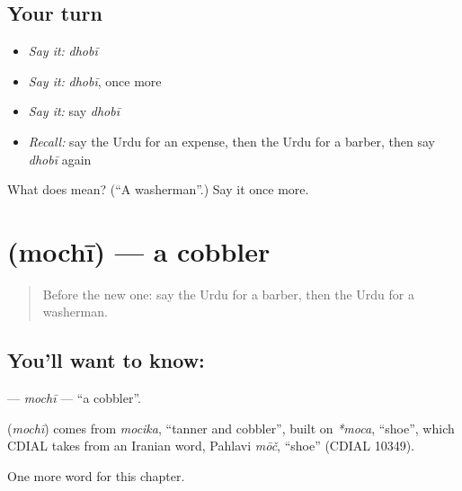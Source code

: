 \subsection*{Your turn}
\begin{itemize}
\raggedright
  \item \emph{Say it:} \emph{dhobī}
  \item \emph{Say it:} \emph{dhobī}, once more
  \item \emph{Say it:} say \emph{dhobī}
  \item \emph{Recall:} say the Urdu for an expense, then the Urdu for a barber, then say \emph{dhobī} again
\end{itemize}

\begin{tcolorbox}[breakable,colback=teal!4,colframe=teal!35!black,title={Before you move on}]
What does  mean? (\textquotedblleft{}A washerman\textquotedblright{}.) Say it once more.
\end{tcolorbox}
\section[\texorpdfstring{\ur{موچی} (mochī)}{موچی (mochī)}]{ (mochī) — a cobbler}

\label{lesson:UR-C210-mochi}



\begin{quote}
Before the new one: say the Urdu for a barber, then the Urdu for a washerman.
\end{quote}

\subsection*{You'll want to know: }
\textbf{} — \emph{mochī} — \textquotedblleft{}a cobbler\textquotedblright{}.

\begin{cousinweb}
\textbf{} (\emph{mochī}) comes from \emph{mocika}, \textquotedblleft{}tanner and cobbler\textquotedblright{}, built on \emph{*moca}, \textquotedblleft{}shoe\textquotedblright{}, which CDIAL takes from an Iranian word, Pahlavi \emph{mōč}, \textquotedblleft{}shoe\textquotedblright{} (CDIAL 10349).
\end{cousinweb}

\begin{grammarlens}[title={What you've built}]
One more word for this chapter.
\end{grammarlens}

